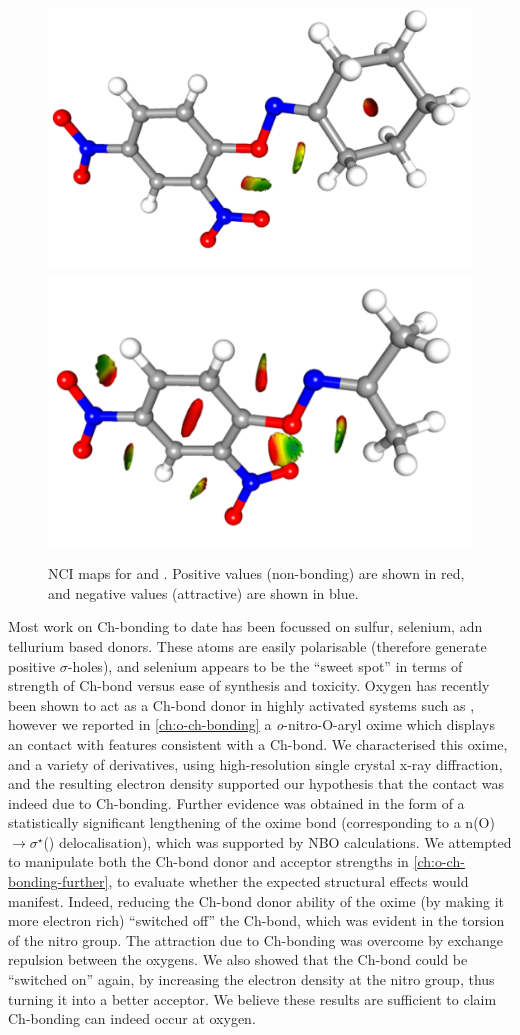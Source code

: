 \begin{refsection}
\begin{figure}
	\centering
	\includegraphics[angle=90,width=0.35\columnwidth]{Figures/cyclohexanone-oxime-dnp-nci.pdf}
	\includegraphics[angle=90,width=0.35\columnwidth]{Figures/acetone-oxime-dnp-nci.pdf}
	\caption[NCI maps for  and .]{NCI maps for  and . Positive values (non-bonding) are shown in red, and negative values (attractive) are shown in blue.}
\end{figure}

Most work on Ch-bonding to date has been focussed on sulfur, selenium, adn tellurium based donors.
These atoms are easily polarisable (therefore generate positive $\sigma$-holes), and selenium appears to be the ``sweet spot'' in terms of strength of Ch-bond versus ease of synthesis and toxicity.
Oxygen has recently been shown to act as a Ch-bond donor in highly activated systems such as , however we reported in \cref{ch:o-ch-bonding} a \textit{o}-nitro-O-aryl oxime which displays an  contact with features consistent with a Ch-bond.
We characterised this oxime, and a variety of derivatives, using high-resolution single crystal x-ray diffraction, and the resulting electron density supported our hypothesis that the contact was indeed due to Ch-bonding.
Further evidence was obtained in the form of a statistically significant lengthening of the  oxime bond (corresponding to a n(O)$ \rightarrow \sigma^{\star} $() delocalisation), which was supported by NBO calculations.
We attempted to manipulate both the Ch-bond donor and acceptor strengths in \cref{ch:o-ch-bonding-further}, to evaluate whether the expected structural effects would manifest.
Indeed, reducing the Ch-bond donor ability of the oxime (by making it more electron rich) ``switched off'' the Ch-bond, which was evident in the torsion of the nitro group.
The attraction due to Ch-bonding was overcome by exchange repulsion between the oxygens.
We also showed that the Ch-bond could be ``switched on'' again, by increasing the electron density at the nitro group, thus turning it into a better acceptor.
We believe these results are sufficient to claim Ch-bonding can indeed occur at oxygen.


\end{refsection}
